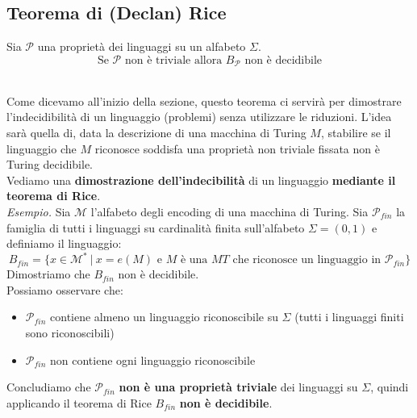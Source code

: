 \subsection{Teorema di (Declan) Rice}
\colorbox{SALZO}{\parbox{\dimexpr\linewidth-2\fboxsep}{\begin{theorem}
   Sia $\mathcal{P}$ una proprietà dei linguaggi su un alfabeto $\Sigma$.
   \[  \text{Se } \mathcal{P} \text{ non è triviale allora } B_{\mathcal{P}} \text{ non è decidibile}    \]
\end{theorem}}}\smallskip\\
Come dicevamo all'inizio della sezione, questo teorema ci servirà per dimostrare l'indecidibilità di un linguaggio (problemi)
senza utilizzare le riduzioni. L'idea sarà quella di, data la descrizione di una macchina di Turing $M$,
stabilire se il linguaggio che $M$ riconosce soddisfa una proprietà non triviale fissata non è Turing decidibile.\smallskip\\
Vediamo una \textbf{dimostrazione dell'indecibilità} di un linguaggio \textbf{mediante il teorema di Rice}.\\
\textit{Esempio.} Sia $\mathcal{M}$ l'alfabeto degli encoding di una macchina di Turing.
Sia $\mathcal{P}_{fin}$ la famiglia di tutti i linguaggi su cardinalità finita sull'alfabeto 
$\Sigma = (0,1)$ e definiamo il linguaggio:
\[   B_{fin} = \{   x \in \mathcal{M^*} \ | \ x = e(M) \text{ e } M \text{ è una } MT \text{ che riconosce un linguaggio in } \mathcal{P}_{fin}
 \}  \]
 Dimostriamo che $B_{fin}$ non è decidibile.\\
 Possiamo osservare che:
 \begin{itemize}
    \item $\mathcal{P}_{fin}$ contiene almeno un linguaggio riconoscibile su $\Sigma$ (tutti i linguaggi finiti sono riconoscibili)
    \item $\mathcal{P}_{fin}$ non contiene ogni linguaggio riconoscibile 
 \end{itemize}
Concludiamo che $\mathcal{P}_{fin}$ \textbf{non è una proprietà triviale} dei linguaggi su $\Sigma$, quindi applicando il teorema di Rice $B_{fin}$ \textbf{non è decidibile}. 




